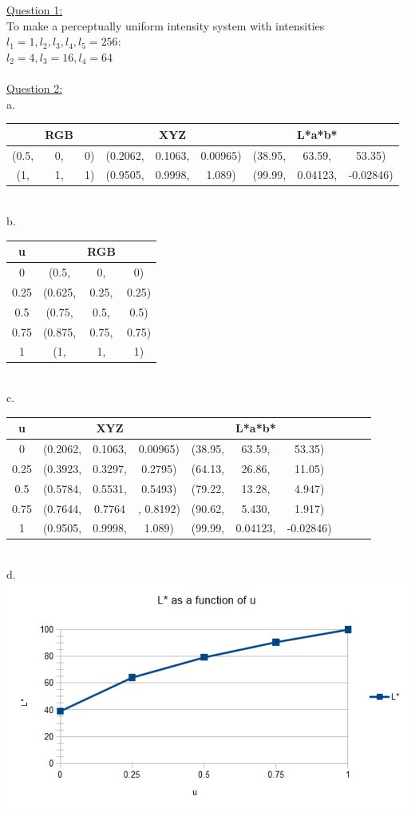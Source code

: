 \documentclass[12pt]{article}\usepackage{amsmath}
\begin{document}
\author{Joel Anna<annajoel@pdx.edu>}
\noindent
\underline{Question 1:}\\
To make a perceptually uniform intensity system with intensities
$l_1 = 1, l_2, l_3, l_4, l_5 = 256$:\\
$l_2 = 4, l_3 = 16, l_4 = 64$
\\\\
\underline{Question 2:}\\
a.
\begin{tabular}{|ccc|ccc|ccc|}
\hline
&RGB& & &XYZ& & &L*a*b*&\\
\hline
(0.5,&0,&0) & (0.2062,& 0.1063,& 0.00965) & (38.95,& 63.59,& 53.35)\\
(1,&1,& 1) & (0.9505,& 0.9998,& 1.089) & (99.99,& 0.04123,& -0.02846)\\
\hline
\end{tabular}\\
b.
\begin{tabular}{|c|ccc|}
\hline
u & &RGB& \\
\hline
0 & (0.5,&0,&0) \\
\hline
0.25 & (0.625,&0.25,& 0.25) \\
\hline
0.5 & (0.75,&0.5,& 0.5) \\
\hline
0.75 & (0.875,&0.75,& 0.75) \\
\hline
1 & (1,&1,& 1) \\
\hline
\end{tabular}\\
c.
\begin{tabular}{|c|ccc|ccc|ccc|}
\hline
u &  &XYZ& & &L*a*b*&\\
\hline
0  & (0.2062,& 0.1063,& 0.00965) & (38.95,& 63.59,& 53.35)\\
\hline
0.25  & (0.3923,& 0.3297,& 0.2795) & (64.13,& 26.86,& 11.05) \\
\hline
0.5  & (0.5784,& 0.5531,& 0.5493) & (79.22,& 13.28,& 4.947)  \\
\hline
0.75 & (0.7644,& 0.7764&, 0.8192) & (90.62,& 5.430,& 1.917)\\
\hline
1  & (0.9505,& 0.9998,& 1.089) & (99.99,& 0.04123,& -0.02846)\\
\hline
\end{tabular}
\pagebreak\\
d.\\
\includegraphics[scale=1]{a.png}
\end{document}
